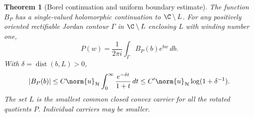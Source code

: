 \documentclass[11pt,a4paper]{article}
\numberwithin{equation}{section}
\newtheorem{theorem}{Theorem}[section]
\theoremstyle{definition}\newtheorem{definition}[theorem]{Definition}
\theoremstyle{remark}\newtheorem{remark}[theorem]{Remark}
\newcommand{\Hh}{\mathcal H}\newcommand{\Hw}{\mathcal H}
\begin{document}
\begin{theorem}[Borel continuation and uniform boundary estimate]\label{d:thm:Borel}
The function $B_P$ has a single-valued holomorphic continuation to $\C\setminus L$. For any positively oriented rectifiable Jordan contour $\Gamma$ in $\C\setminus L$ enclosing $L$ with winding number one,
\begin{equation}\label{d:eq:B-inversion}
 P(w)=\frac1{2\pi i}\int_\Gamma B_P(b)e^{bw}\,db.
\end{equation}
With $\delta=\operatorname{dist}(b,L)>0$,
\begin{equation}\label{d:eq:B-bound}
 |B_P(b)|\le C\norm{u}_{\Hh}
       \int_0^\infty\frac{e^{-\delta t}}{1+t}\,dt
 \le C'\norm{u}_{\Hh}\log(1+\delta^{-1}).
\end{equation}
The set $L$ is the smallest common closed convex carrier for all the rotated quotients $P$. Individual carriers may be smaller.
\end{theorem}
\end{document}
